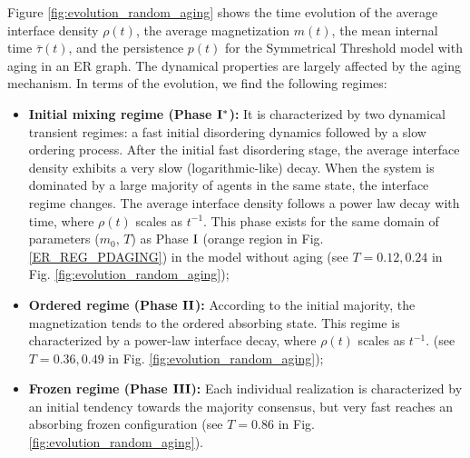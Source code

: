

Figure \ref{fig:evolution_random_aging} shows the time evolution of the average interface density $\rho(t)$, the average magnetization $m(t)$, the mean internal time $\bar{\tau}(t)$, and the persistence $p(t)$ for the Symmetrical Threshold model with aging in an ER graph. The dynamical properties are largely affected by the aging mechanism. In terms of the evolution, we find the following regimes:
\begin{itemize}
    \item \textbf{Initial mixing regime (Phase ${\rm {\bf I}}^{*}$):} It is characterized by two dynamical transient regimes: a fast initial disordering dynamics followed by a slow ordering process. After the initial fast disordering stage, the average interface density exhibits a very slow (logarithmic-like) decay. When the system is dominated by a large majority of agents in the same state, the interface regime changes. The average interface density follows a power law decay with time, where $\rho(t)$ scales as $t^{-1}$. This phase exists for the same domain of parameters ($m_0$, $T$) as Phase ${\rm I}$ (orange region in Fig. \ref{ER_REG_PDAGING}) in the model without aging (see $T = 0.12, 0.24$ in Fig. \ref{fig:evolution_random_aging});
    \item \textbf{Ordered regime (Phase ${\rm {\bf II}}$):} According to the initial majority, the magnetization tends to the ordered absorbing state. This regime is characterized by a power-law interface decay, where $\rho(t)$ scales as $t^{-1}$. (see $T = 0.36, 0.49$ in Fig. \ref{fig:evolution_random_aging});
    \item \textbf{Frozen regime (Phase ${\rm {\bf III}}$):} Each individual realization is characterized by an initial tendency towards the majority consensus, but very fast reaches an absorbing frozen configuration (see $T = 0.86$ in Fig. \ref{fig:evolution_random_aging}).
\end{itemize}
